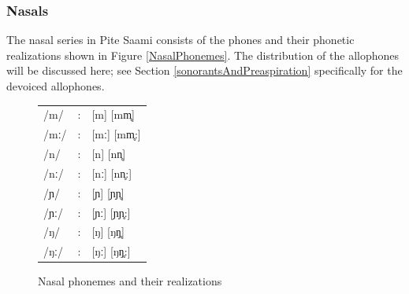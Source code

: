 \subsubsection{Nasals}\label{Nasals}%
The nasal series in Pite Saami consists of the phones and their phonetic realizations shown in Figure \vref{NasalPhonemes}. The distribution of the allophones will be discussed here; see Section \ref{sonorantsAndPreaspiration} specifically for the devoiced allophones. 
\begin{figure}\centering
\begin{tabular}{l c l}
/m/ &:& [m] [mm̥] \\ %
/mː/ &:& [mː] [mm̥:] \\ %
/n/ &:& [n] [nn̥] \\ %
/nː/ &:& [nː] [nn̥:]\\ %
/ɲ/ &:& [ɲ] [ɲɲ̥]\\ %
/ɲː/ &:& [ɲː] [ɲɲ̥:]\\ %
/ŋ/ &:& [ŋ] [ŋŋ̥]\\ %
/ŋː/ &:& [ŋː] [ŋŋ̥:]\\ %
\end{tabular}
\caption{Nasal phonemes and their realizations}\label{NasalPhonemes}
\end{figure}


